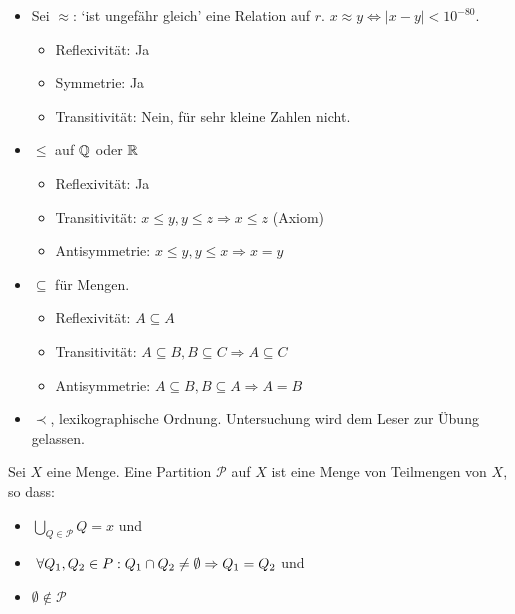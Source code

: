 \documentclass[main.tex]{subfiles}
\begin{document}
\begin{Beispiel}[Äquivalenzrelationen]
\begin{itemize}
\begin{itemize}
    \end{itemize}
    \item Sei $\approx$: `ist ungefähr gleich' eine Relation auf $r$. $x \approx y \Leftrightarrow |x-y| < 10^{-80}$.
    \begin{itemize}
      \item Reflexivität: Ja
      \item Symmetrie: Ja
      \item Transitivität: Nein, für sehr kleine Zahlen nicht.
    \end{itemize}
  \end{itemize}
\end{Beispiel}

\begin{Beispiel}[Ordnungsrelationen]
  \begin{itemize}
    \item $\leq$ auf $\mathbb{Q}$ oder $\mathbb{R}$
    \begin{itemize}
      \item Reflexivität: Ja
      \item Transitivität: $x\leq y, y\leq z \Rightarrow x\leq z$ (Axiom)
      \item Antisymmetrie: $x\leq y, y\leq x \Rightarrow x = y$
    \end{itemize}
    \item $\subseteq$ für Mengen.
    \begin{itemize}
      \item Reflexivität: $A \subseteq{A}$
      \item Transitivität: $A \subseteq B, B \subseteq C \Rightarrow A \subseteq C$
      \item Antisymmetrie: $A \subseteq B, B \subseteq A \Rightarrow A = B$
    \end{itemize}
    \item $\prec$, lexikographische Ordnung. Untersuchung wird dem Leser zur Übung gelassen.
  \end{itemize}
\end{Beispiel}

\begin{Definition}[Partition]
  Sei $X$ eine Menge. Eine Partition $\mathcal{P}$ auf $X$ ist eine Menge von Teilmengen von $X$, so dass:
  \begin{itemize}
    \item $\bigcup_{Q\in \mathcal{P}} Q = x$ und
    \item $\;\forall Q_1,Q_2 \in P: Q_1 \cap Q_2 \neq \emptyset \Rightarrow Q_1 = Q_2$ und
    \item $\emptyset \notin \mathcal{P}$
  \end{itemize}
\end{Definition}
\end{document}
